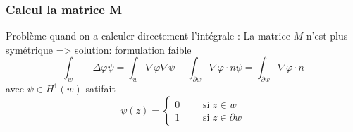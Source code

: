 \begin{frame}
\frametitle{Calcul la matrice M}
Probl\`eme quand on a calculer directement l'int\'egrale : La matrice $M$ n'est plus sym\'etrique 
=> solution: formulation faible
\begin{equation}
\int_w -\Delta\varphi \psi =\int_w \nabla\varphi\nabla\psi - \int_{\partial w} \nabla\varphi\cdot n \psi =\int_{\partial w} \nabla\varphi\cdot n 
\end{equation}
avec $\psi \in H^1(w)$ satifait 
\begin{equation}
\psi(z) =
\begin{cases}
0 \qquad \text{ si } z\in w \\
1 \qquad \text{ si } z\in \partial w
\end{cases}
\end{equation} 


\end{frame} 
